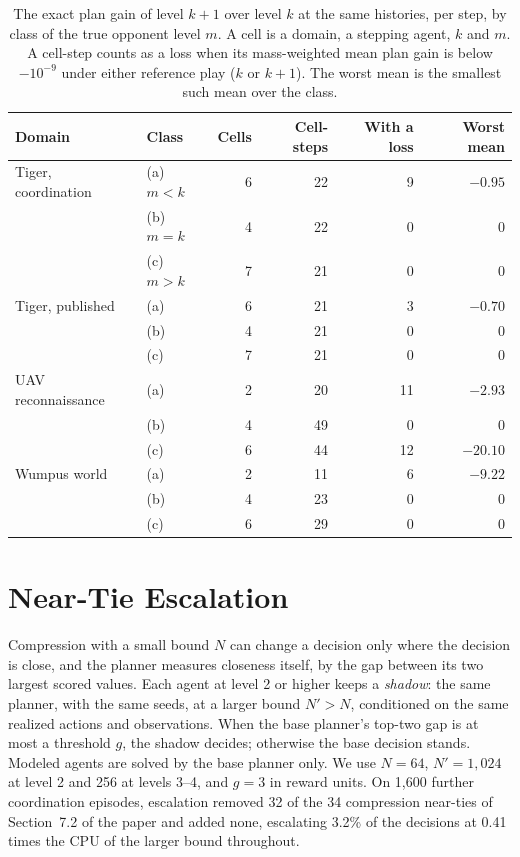 \documentclass{article}
\begin{document}
\begin{table}[h]
\centering
\begin{tabular}{@{}llrrrr@{}}
\toprule
Domain & Class & Cells & Cell-steps & With a loss & Worst mean \\
\midrule
Tiger, coordination & (a) $m<k$ & 6 & 22 & 9 & $-0.95$ \\
 & (b) $m=k$ & 4 & 22 & 0 & $0$ \\
 & (c) $m>k$ & 7 & 21 & 0 & $0$ \\
Tiger, published & (a) & 6 & 21 & 3 & $-0.70$ \\
 & (b) & 4 & 21 & 0 & $0$ \\
 & (c) & 7 & 21 & 0 & $0$ \\
UAV reconnaissance & (a) & 2 & 20 & 11 & $-2.93$ \\
 & (b) & 4 & 49 & 0 & $0$ \\
 & (c) & 6 & 44 & 12 & $-20.10$ \\
Wumpus world & (a) & 2 & 11 & 6 & $-9.22$ \\
 & (b) & 4 & 23 & 0 & $0$ \\
 & (c) & 6 & 29 & 0 & $0$ \\
\bottomrule
\end{tabular}
\caption{The exact plan gain of level $k+1$ over level $k$ at the same histories, per step, by class of the true opponent level $m$. A cell is a domain, a stepping agent, $k$ and $m$. A cell-step counts as a loss when its mass-weighted mean plan gain is below $-10^{-9}$ under either reference play ($k$ or $k+1$). The worst mean is the smallest such mean over the class.}
\label{tab:classes}
\end{table}

\section{Near-Tie Escalation}
\label{sec:escalation}

Compression with a small bound $N$ can change a decision only where the decision is close, and the planner measures closeness itself, by the gap between its two largest scored values. Each agent at level 2 or higher keeps a \emph{shadow}: the same planner, with the same seeds, at a larger bound $N' > N$, conditioned on the same realized actions and observations. When the base planner's top-two gap is at most a threshold $g$, the shadow decides; otherwise the base decision stands. Modeled agents are solved by the base planner only. We use $N = 64$, $N' = 1{,}024$ at level 2 and 256 at levels 3--4, and $g = 3$ in reward units. On 1{,}600 further coordination episodes, escalation removed 32 of the 34 compression near-ties of Section~7.2 of the paper and added none, escalating 3.2\% of the decisions at 0.41 times the CPU of the larger bound throughout.
\end{document}
